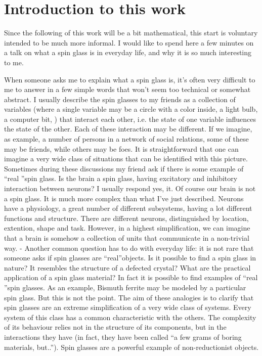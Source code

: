 
\chapter{Introduction to this work}

Since the following of this work will be a bit mathematical, this start is voluntary intended to be much more informal. I would like to spend here a few minutes on a talk on what a spin glass is in everyday life, and why it is so much interesting to me.

When someone asks me to explain what a spin glass is, it's often very difficult to me to answer in a few simple words that won't seem too technical or somewhat abstract. 
I usually describe the spin glasses to my friends as a collection of variables (where a single variable may be a circle with a color inside, a light bulb, a computer bit, ) that interact each other, i.e. the state of one variable influences the state of the other. Each of these interaction may be different. If we imagine, as example, a number of persons in a network of social relations, some of these may be friends, while
others may be foes. It is straightforward that one can imagine a very wide class of situations that can be identified with this picture. Sometimes during these discussions my friend ask if there is some example
 of \textquotedblleft real \textquotedblright  spin glass. Is the brain a spin glass, having excitatory and inhibitory interaction between neurons? I usually respond yes, it. Of course our brain is not a spin glass.
It is much more complex than what I've just described. Neurons have a physiology, a great number of different subsystems, having a lot different functions and structure. There are different neurons, distinguished by location, extention, shape and task. However, in a highest simplification, we can imagine that a brain is somehow a collection of units that communicate in a non-trivial way.
-
Another common question has to do with everyday life: it is not rare that someone asks if spin glasses are \textquotedblleft real\textquotedblright objects. Is it possible to find a spin glass in nature? It resembles the structure of a defected crystal? What are the practical application of a spin glass material? In fact it is possible to find examples of \textquotedblleft real \textquotedblright spin glasses. As an example,
Bismuth ferrite may be modeled by a particular spin glass. But this is not the point. The aim of these analogies is to clarify that spin glasses are an extreme simplification of a very wide class of systems.
Every system of this class has a common characteristic with the others. The complexity of its behaviour
relies not in the structure of its components, but in the interactions they have (in fact, they have been called \textquotedblleft a few grams of boring materials, but..\textquotedblright). Spin glasses are a powerful example of non-reductionist objects.

